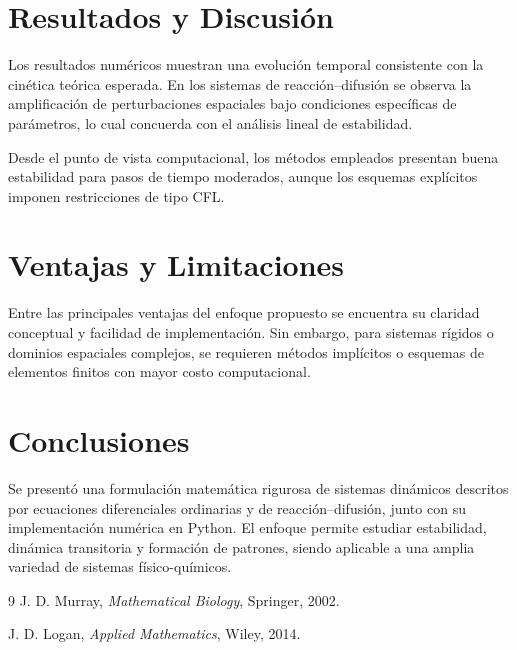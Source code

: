 \documentclass[12pt,letterpaper]{article}
\begin{document}
	\section{Resultados y Discusión}
	Los resultados numéricos muestran una evolución temporal consistente con la cinética teórica esperada. En los sistemas de reacción--difusión se observa la amplificación de perturbaciones espaciales bajo condiciones específicas de parámetros, lo cual concuerda con el análisis lineal de estabilidad.
	
	Desde el punto de vista computacional, los métodos empleados presentan buena estabilidad para pasos de tiempo moderados, aunque los esquemas explícitos imponen restricciones de tipo CFL.
	
	\section{Ventajas y Limitaciones}
	Entre las principales ventajas del enfoque propuesto se encuentra su claridad conceptual y facilidad de implementación. Sin embargo, para sistemas rígidos o dominios espaciales complejos, se requieren métodos implícitos o esquemas de elementos finitos con mayor costo computacional.
	
	\section{Conclusiones}
	Se presentó una formulación matemática rigurosa de sistemas dinámicos descritos por ecuaciones diferenciales ordinarias y de reacción--difusión, junto con su implementación numérica en Python. El enfoque permite estudiar estabilidad, dinámica transitoria y formación de patrones, siendo aplicable a una amplia variedad de sistemas físico-químicos.
	
	
	\begin{thebibliography}{9}
		J. D. Murray,
		\textit{Mathematical Biology},
		Springer, 2002.
		
		J. D. Logan,
		\textit{Applied Mathematics},
		Wiley, 2014.
	\end{thebibliography}
	
\end{document}
